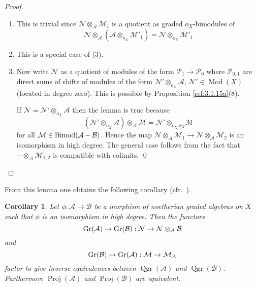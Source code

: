 \documentclass{amsproc}
\def\Ascr{{\mathcal A}}
\def\Bscr{{\mathcal B}}
\def\Mscr{{\mathcal M}}
\def\Nscr{{\mathcal N}}
\def\Pscr{{\mathcal P}}
\def\Bimod{\mathop{\text{Bimod}}}
\def\Gr{\mathop{\text{Gr}}}
\def\ox{{o_X}}
\def\Proj{\operatorname {Proj}}
\def\Qgr{\operatorname {Qgr}}
\def\Qch{\operatorname {Mod}}
\def\r{\rightarrow}
\let\oldtext\text
\def\text#1{\oldtext{\upshape #1}}
\newtheorem{corollarys}[lemmas]{Corollary}
\theoremstyle{definition}
\theoremstyle{remark}
\numberwithin{equation}{section}
\numberwithin{table}{section}
\numberwithin{figure}{section}
\def\Gr{\mathop{\text{Gr}}}
\begin{document}
\begin{proof} 
\begin{enumerate}
\item This is trivial since $\Nscr\otimes_\Ascr\Mscr_1$ is a quotient
  as graded
$\ox$-bimodules of
\[
\Nscr\otimes_\Ascr(\Ascr\otimes_\ox\Mscr'_1)=\Nscr\otimes_\ox\Mscr'_1
\]
\item
This is a special case of (3).
\item
Now write $\Nscr$ as a quotient of modules of the form
$\Pscr_1\r\Pscr_0$ where $\Pscr_{0,1}$ are direct sums of shifts of
modules of the form $\Nscr'\otimes_\ox\Ascr$, $\Nscr'\in\Qch(X)$ (located
in degree zero). This is possible by Proposition \ref{ref:3.1.15a}(8). 

If $\Nscr=\Nscr'\otimes_\ox\Ascr$ then the lemma is true because 
\[
(\Nscr'\otimes_\ox\Ascr)\otimes_\Ascr\Mscr=\Nscr'\otimes_\ox
{}_\ox\!\Mscr
\]
for all $\Mscr\in\Bimod(\Ascr-\Bscr)$. Hence the map
$\Nscr\otimes_\Ascr\Mscr_1\r\Nscr\otimes_\Ascr\Mscr_2$ is an
isomorphism in high degree. The general case follows from the fact
that $-\otimes_\Ascr\Mscr_{1,2}$ is compatible with colimits.
\qed\end{enumerate} \def\qed{}\end{proof} From this lemma one obtains
the following corollary (cfr.\ \cite[Prop.\ 2.5]{AZ}).
\begin{corollarys}
\label{ref:3.8.2a}
Let $\phi:\Ascr\r\Bscr$ be a morphism of noetherian graded algebras on $X$ such
that $\phi$ is an isomorphism in high degree. Then the functors 
\begin{equation}
\label{ref:3.21a}
\Gr(\Ascr)\r\Gr(\Bscr):\Nscr\r \Nscr\otimes_\Ascr\Bscr
\end{equation}
and
\begin{equation}
\label{ref:3.22a}
\Gr(\Bscr)\r\Gr(\Ascr):\Mscr\r\Mscr_\Ascr
\end{equation}
factor to give inverse equivalences between $\Qgr(\Ascr)$ and
$\Qgr(\Bscr)$. Furthermore  $\Proj(\Ascr)$ and
$\Proj(\Bscr)$ are equivalent.
\end{corollarys}
\end{document}
